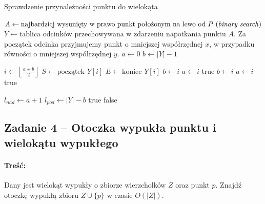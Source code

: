 \begin{algorithm}[H]
	\caption{Sprawdzenie przynależności punktu do wielokąta}
	\begin{algorithmic}[1]
			\State $A \gets \text{najbardziej wysunięty w prawo punkt położonym na lewo od $P$ (\textit{binary search})}$	
			\State $Y \gets \text{tablica odcinków przechowywana w zdarzeniu napotkania punktu $A$. }$Za początek odcinka przyjmujemy punkt o mniejszej współrzędnej $x$, w przypadku równości o mniejszej współrzędnej $y$.
			\State $a \gets 0$
			\State $b \gets |Y|-1$
			\State 
			
				\State $i \gets \left\lfloor \frac{a+b}{2} \right\rfloor$
				\State $S \gets \text{początek } Y[i]$ 
				\State $E \gets \text{koniec } Y[i]$ 
				 
					\State $b \gets i$
				 
					\State $a \gets i$
					 
						\State \Return true 
					 
						\State $b \gets i$
					 
						\State $a \gets i$
					\Else {}
						\State \Return true 
					\EndIf
				
				\EndIf    
			\EndWhile
			\State
			\State $l_{nad} \gets  a +1$
			\State $l_{pod} \gets |Y| - b$
				\State \Return true
			\EndIf
			\State
			\State \Return false
		\EndProcedure
	\end{algorithmic}
	\label{alg:Zadanie7_1}
\end{algorithm}

\subsection{Zadanie 4 -- Otoczka wypukła punktu i wielokątu wypukłego}
\paragraph{Treść:} Dany jest wielokąt wypukły o zbiorze wierzcholków $Z$ oraz punkt $p$. Znajdź otoczkę wypukłą zbioru $Z \cup \{p\}$ w czasie $O(|Z|)$.
